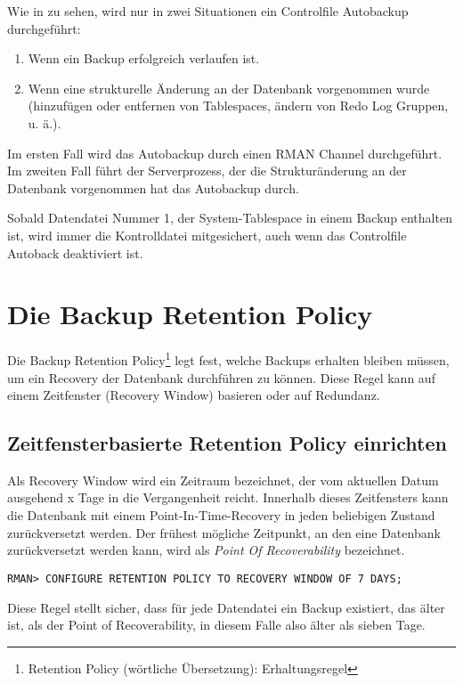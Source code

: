       Wie in  zu sehen, wird nur in zwei Situationen ein Controlfile Autobackup durchgeführt:
      \begin{enumerate}
        \item Wenn ein Backup erfolgreich verlaufen ist.
        \item Wenn eine strukturelle Änderung an der Datenbank vorgenommen wurde (hinzufügen oder entfernen von Tablespaces, ändern von Redo Log Gruppen, u. ä.).
      \end{enumerate}
      Im ersten Fall wird das Autobackup durch einen RMAN Channel durchgeführt. Im zweiten Fall führt der Serverprozess, der die Strukturänderung an der Datenbank vorgenommen hat das Autobackup durch.
      \begin{merke}
        Sobald Datendatei Nummer 1, der System-Tablespace in einem Backup enthalten ist, wird immer die Kontrolldatei mitgesichert, auch wenn das Controlfile Autoback deaktiviert ist.
      \end{merke}

      \begin{literaturinternet}
        \item \cite[Control File and Server Parameter File Autobackups]{cfandspfileautobackups}
      \end{literaturinternet}
    \section{Die Backup Retention Policy}
      \label{backupretentionpolicy}
      Die Backup Retention Policy\footnote{Retention Policy (wörtliche Übersetzung): Erhaltungsregel} legt fest, welche Backups erhalten bleiben müssen, um ein Recovery der Datenbank durchführen zu können. Diese Regel kann auf einem Zeitfenster (Recovery Window) basieren oder auf Redundanz.
      \subsection{Zeitfensterbasierte Retention Policy einrichten}
        Als Recovery Window wird ein Zeitraum bezeichnet, der vom aktuellen Datum ausgehend x Tage in die Vergangenheit reicht. Innerhalb dieses Zeitfensters kann die Datenbank mit einem Point-In-Time-Recovery in jeden beliebigen Zustand zurückversetzt werden. Der frühest mögliche Zeitpunkt, an den eine Datenbank zurückversetzt werden kann, wird als \textit{Point Of Recoverability} bezeichnet.
        \begin{lstlisting}[caption={RECOVERY WINDOW setzen},label=admin1025,language=rman]
RMAN> CONFIGURE RETENTION POLICY TO RECOVERY WINDOW OF 7 DAYS;
        \end{lstlisting}
        Diese Regel stellt sicher, dass für jede Datendatei ein Backup existiert, das älter ist, als der Point of Recoverability, in diesem Falle also älter als sieben Tage.


